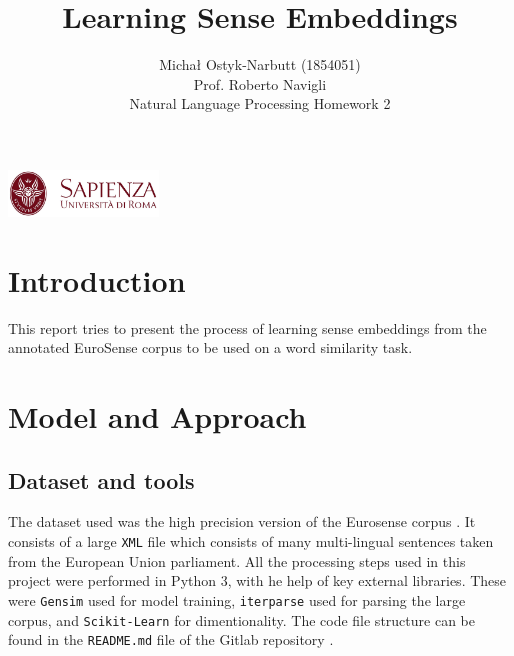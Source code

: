 \documentclass[12pt,a4paper]{article}
\begin{document}
\title{Learning Sense Embeddings}
\author{Michał Ostyk-Narbutt (1854051)\\Prof. Roberto Navigli \\ Natural Language Processing Homework 2}

\maketitle


\begin{center}
\includegraphics[width=0.3\textwidth]{img/sapienza_logo.jpg}
\end{center}
\maketitle
\tableofcontents
\clearpage
\section{Introduction}
This report tries to present the process of learning sense embeddings from the annotated EuroSense corpus to be used on a word similarity task. 
\section{Model and Approach}
\subsection{Dataset and tools}
The dataset used was the high precision version of the Eurosense corpus \cite{Eurosense}. It consists of a large \texttt{XML} file which consists of many multi-lingual sentences taken from the European Union parliament. All the processing steps used in this project were performed in Python 3, with he help of key external libraries. These were  \texttt{Gensim}  used for model training, \texttt{iterparse} used for parsing the large corpus, and \texttt{Scikit-Learn} for dimentionality. The code file structure can be found in the \texttt{README.md} file of the Gitlab repository \cite{code}.
\end{document}
